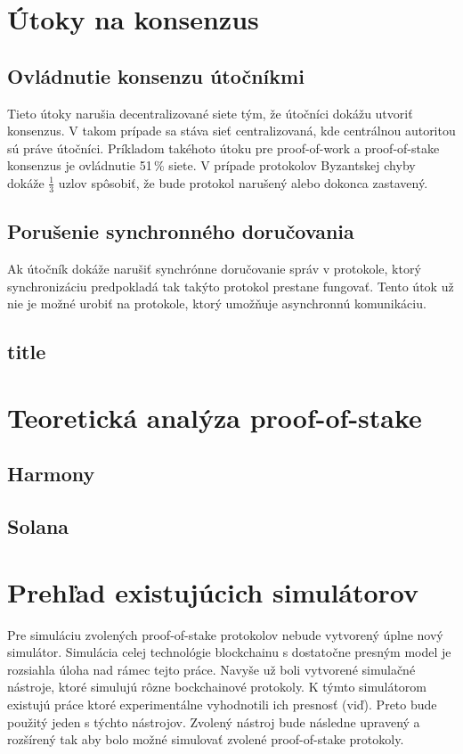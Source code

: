 \chapter{Útoky na konsenzus}

\section{Ovládnutie konsenzu útočníkmi}
Tieto útoky narušia decentralizované siete tým, že útočníci dokážu utvoriť konsenzus. V takom prípade sa stáva sieť centralizovaná, kde centrálnou autoritou sú práve útočníci. Príkladom takéhoto útoku pre proof-of-work a proof-of-stake konsenzus je ovládnutie 51\,\% siete. V prípade protokolov Byzantskej chyby dokáže $\frac{1}{3}$ uzlov spôsobiť, že bude protokol narušený alebo dokonca zastavený.~\cite{homoliakBlockchain}

\section{Porušenie synchronného doručovania}

Ak útočník dokáže narušiť synchrónne doručovanie správ v protokole, ktorý synchronizáciu predpokladá tak takýto protokol prestane fungovať. Tento útok už nie je možné urobiť na protokole, ktorý umožňuje asynchronnú komunikáciu. ~\cite{homoliakBlockchain}

\section{title}

\chapter{Teoretická analýza proof-of-stake}

\section{Harmony}

\section{Solana}

\chapter{Prehľad existujúcich simulátorov}

Pre simuláciu zvolených proof-of-stake protokolov nebude vytvorený úplne nový simulátor. Simulácia celej technológie blockchainu s dostatočne presným model je rozsiahla úloha nad rámec tejto práce. Navyše už boli vytvorené simulačné nástroje, ktoré simulujú rôzne bockchainové protokoly. K týmto simulátorom existujú práce ktoré experimentálne vyhodnotili ich presnosť (viď\cite{simulatorCompar, fanPerfEval}). Preto bude použitý jeden s týchto nástrojov. Zvolený nástroj bude následne upravený a rozšírený tak aby bolo možné simulovať zvolené proof-of-stake protokoly. 

